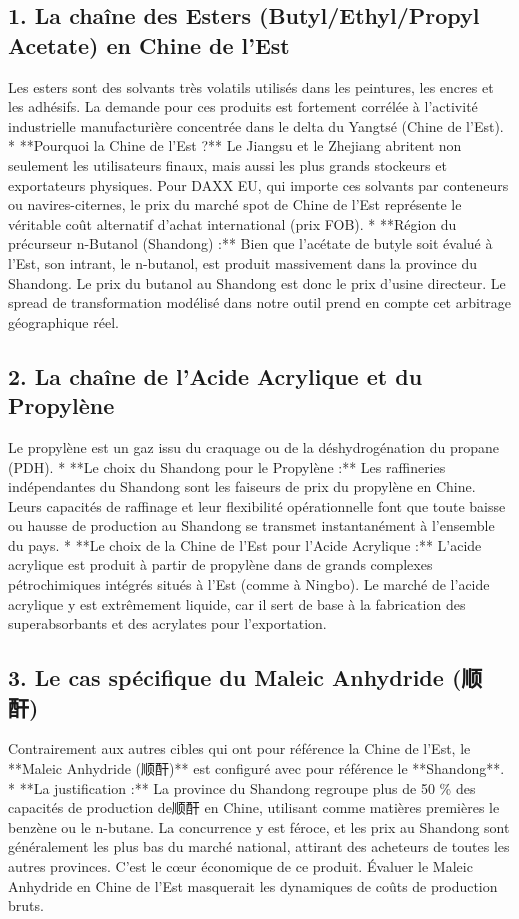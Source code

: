 \documentclass[12pt,a4paper]{article}
\begin{document}
\subsection{1. La chaîne des Esters (Butyl/Ethyl/Propyl Acetate) en Chine de l'Est}
Les esters sont des solvants très volatils utilisés dans les peintures, les encres et les adhésifs. La demande pour ces produits est fortement corrélée à l'activité industrielle manufacturière concentrée dans le delta du Yangtsé (Chine de l'Est). 
* **Pourquoi la Chine de l'Est ?** Le Jiangsu et le Zhejiang abritent non seulement les utilisateurs finaux, mais aussi les plus grands stockeurs et exportateurs physiques. Pour DAXX EU, qui importe ces solvants par conteneurs ou navires-citernes, le prix du marché spot de Chine de l'Est représente le véritable coût alternatif d'achat international (prix FOB). 
* **Région du précurseur n-Butanol (Shandong) :** Bien que l'acétate de butyle soit évalué à l'Est, son intrant, le n-butanol, est produit massivement dans la province du Shandong. Le prix du butanol au Shandong est donc le prix d'usine directeur. Le spread de transformation modélisé dans notre outil prend en compte cet arbitrage géographique réel.

\subsection{2. La chaîne de l'Acide Acrylique et du Propylène}
Le propylène est un gaz issu du craquage ou de la déshydrogénation du propane (PDH).
* **Le choix du Shandong pour le Propylène :** Les raffineries indépendantes du Shandong sont les faiseurs de prix du propylène en Chine. Leurs capacités de raffinage et leur flexibilité opérationnelle font que toute baisse ou hausse de production au Shandong se transmet instantanément à l'ensemble du pays.
* **Le choix de la Chine de l'Est pour l'Acide Acrylique :** L'acide acrylique est produit à partir de propylène dans de grands complexes pétrochimiques intégrés situés à l'Est (comme à Ningbo). Le marché de l'acide acrylique y est extrêmement liquide, car il sert de base à la fabrication des superabsorbants et des acrylates pour l'exportation.

\subsection{3. Le cas spécifique du Maleic Anhydride (顺酐)}
Contrairement aux autres cibles qui ont pour référence la Chine de l'Est, le **Maleic Anhydride (顺酐)** est configuré avec pour référence le **Shandong**.
* **La justification :** La province du Shandong regroupe plus de 50 \% des capacités de production de顺酐 en Chine, utilisant comme matières premières le benzène ou le n-butane. La concurrence y est féroce, et les prix au Shandong sont généralement les plus bas du marché national, attirant des acheteurs de toutes les autres provinces. C'est le cœur économique de ce produit. Évaluer le Maleic Anhydride en Chine de l'Est masquerait les dynamiques de coûts de production bruts.
\end{document}
